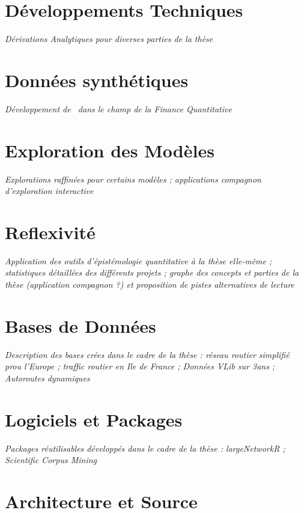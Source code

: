\section{Développements Techniques}


\textit{Dérivations Analytiques pour diverses parties de la thèse}


\section{Données synthétiques}

\textit{Développement de~\cite{raimbault2016generation} dans le champ de la Finance Quantitative}


\section{Exploration des Modèles}

\textit{Explorations raffinées pour certains modèles ; applications compagnon d'exploration interactive}


\section{Reflexivité}


\textit{Application des outils d'épistémologie quantitative à la thèse elle-même ; statistiques détaillées des différents projets ; graphe des concepts et parties de la thèse (application compagnon ?) et proposition de pistes alternatives de lecture}


\section{Bases de Données}


\textit{Description des bases crées dans le cadre de la thèse : réseau routier simplifié prou l'Europe ; traffic routier en Ile de France ; Données VLib sur 3ans ; Autoroutes dynamiques} 


\section{Logiciels et Packages}

\textit{Packages réutilisables développés dans le cadre de la thèse : largeNetworkR ; Scientific Corpus Mining}


\section{Architecture et Source}

